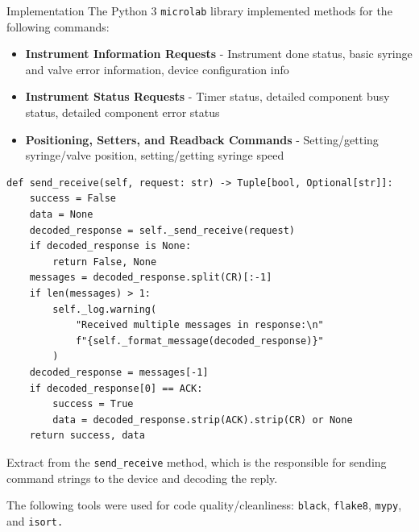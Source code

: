 \documentclass[a0paper,landscape,fontscale=0.32]{baposter}
\begin{document}
\begin{poster}
\begin{posterbox}[name=implementation,column=1,span=2]{Implementation}
The Python 3 \texttt{microlab} library implemented methods for the following commands:
 \begin{itemize}
     \item \textbf{Instrument Information Requests} - Instrument done status, basic syringe and valve error
         information, device configuration info
     \item \textbf{Instrument Status Requests} - Timer status, detailed component busy status, detailed
         component error status
     \item \textbf{Positioning, Setters, and Readback Commands} - Setting/getting
         syringe/valve position, setting/getting syringe speed 
\end{itemize}
\vspace{-1.5em}
\begin{listing}[H]
    \begin{verbatim}
def send_receive(self, request: str) -> Tuple[bool, Optional[str]]:
    success = False
    data = None
    decoded_response = self._send_receive(request)
    if decoded_response is None:
        return False, None
    messages = decoded_response.split(CR)[:-1]
    if len(messages) > 1:
        self._log.warning(
            "Received multiple messages in response:\n"
            f"{self._format_message(decoded_response)}"
        )
    decoded_response = messages[-1]
    if decoded_response[0] == ACK:
        success = True
        data = decoded_response.strip(ACK).strip(CR) or None
    return success, data
\end{verbatim}
    \caption{Extract from the \texttt{send\_receive} method, which is the responsible for sending command
    strings to the device and decoding the reply.}
\end{listing}
    \vspace{-1.2em}
    The following tools were used for code quality/cleanliness: \texttt{black}, \texttt{flake8}, \texttt{mypy},
    and \texttt{isort.}
\end{posterbox}

\end{poster}
\end{document}
